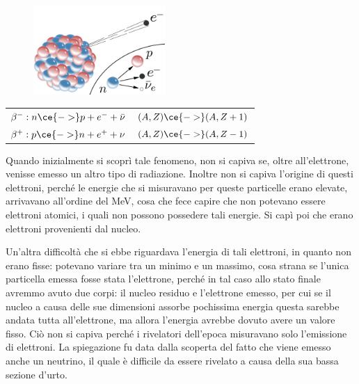 \begin{minipage}{0.395\textwidth}
    \begin{figure}[H]
        \centering
        \includegraphics[width=5cm]{immagini/decadimento_beta.png}
    \end{figure}
\end{minipage}
\begin{minipage}{0.6\textwidth}
    \begin{center}
        \begin{tabular}{ll}
            $\beta^-: n \ce{->} p + e^- + \bar{\nu}$ & $(A,Z) \ce{ -> } (A,Z +1)$\\
            $\beta^+: p \ce{->} n + e^+ + \nu$ & $(A,Z) \ce{-> } (A,Z -1)$
        \end{tabular}
    \end{center}
\end{minipage}

\vspace{0.4cm}

Quando inizialmente si scoprì tale fenomeno, non si capiva se, oltre all'elettrone, venisse emesso un altro tipo di radiazione. Inoltre non si capiva l'origine di questi elettroni, perché le energie che si misuravano per queste particelle erano elevate, arrivavano all'ordine del MeV, cosa che fece capire che non potevano essere elettroni atomici, i quali non possono possedere tali energie. Si capì poi che erano elettroni provenienti dal nucleo.

Un'altra difficoltà che si ebbe riguardava l'energia di tali elettroni, in quanto non erano fisse: potevano variare tra un minimo e un massimo, cosa strana se l'unica particella emessa fosse stata l'elettrone, perché in tal caso allo stato finale avremmo avuto due corpi: il nucleo residuo e l'elettrone emesso, per cui se il nucleo a causa delle sue dimensioni assorbe pochissima energia questa sarebbe andata tutta all'elettrone, ma allora l'energia avrebbe dovuto avere un valore fisso. Ciò non si capiva perché i rivelatori dell'epoca misuravano solo l'emissione di elettroni. La spiegazione fu data dalla scoperta del fatto che viene emesso anche un neutrino, il quale è difficile da essere rivelato a causa della sua bassa sezione d'urto.

